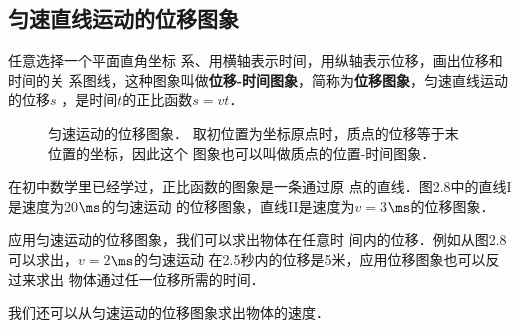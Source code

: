     \subsection{匀速直线运动的位移图象} 
    
    任意选择一个平面直角坐标
系、用横轴表示时间，用纵轴表示位移，画出位移和时间的关
系图线，这种图象叫做\textbf{位移-时间图象}，简称为\textbf{位移图象}，匀速直线运动的位移$s$
，是时间$t$的正比函数$s=vt$．
\begin{figure}[htp]
    \centering
    \caption{匀速运动的位移图象．
    取初位置为坐标原点时，质点的位移等于末位置的坐标，因此这个
    图象也可以叫做质点的位置-时间图象．}
    \end{figure}

在初中数学里已经学过，正比函数的图象是一条通过原
点的直线．图2.8中的直线I是速度为20$\ms$的匀速运动
的位移图象，直线II是速度为$v=3$$\ms$的位移图象．


    应用匀速运动的位移图象，我们可以求出物体在任意时
间内的位移．例如从图2.8可以求出，$v=2$$\ms$的匀速运动
在2.5秒内的位移是5米，应用位移图象也可以反过来求出
物体通过任一位移所需的时间．


我们还可以从匀速运动的位移图象求出物体的速度．

